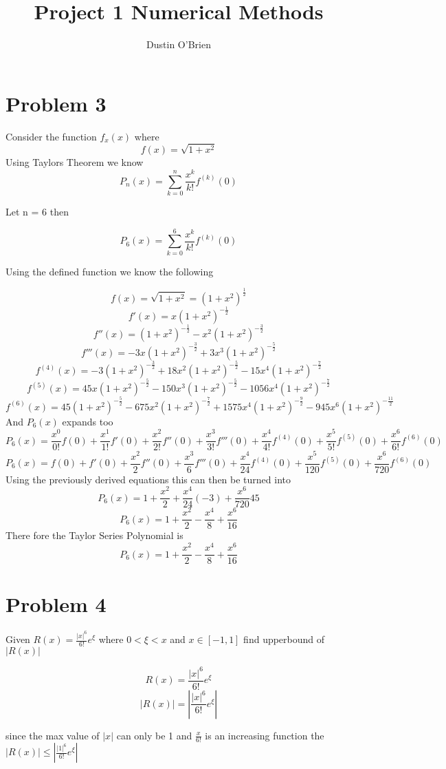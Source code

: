 \documentclass[]{article}
\title{Project 1 Numerical Methods}
\author{Dustin O'Brien}
\begin{document}
\maketitle


\section*{Problem 3}

	Consider the function $f_x(x)$ where
	\[f(x) = \sqrt{1 + x^2}\]
	Using Taylors Theorem we know
	\[P_n(x) = \sum_{k=0}^{n}\frac{x^k}{k!}f^{(k)}(0)\]
	
	Let n = 6 then

	\[P_6(x) = \sum_{k=0}^{6}\frac{x^k}{k!}f^{(k)}(0)\]
	
	Using the defined function we know the following
	
	\[f(x) = \sqrt{1 + x^2} = (1 + x^2)^{\frac{1}{2}}\]
	\[f'(x) = x(1 + x^2)^{-\frac{1}{2}}\]
	\[f''(x) = (1 + x^2)^{-\frac{1}{2}} - x^2(1 + x^2)^{-\frac{3}{2}}\]
	\[f'''(x) = -3x(1 + x^2)^{-\frac{3}{2}} + 3x^3(1 + x^2)^{-\frac{5}{2}}\]
	\[f^{(4)}(x) = -3(1 + x^2)^{-\frac{3}{2}} + 18x^2(1 + x^2)^{-\frac{5}{2}} - 15x^4(1 + x^2)^{-\frac{7}{2}}\]
	\[f^{(5)}(x) = 45x(1 + x^2)^{-\frac{5}{2}} -150x^3(1 + x^2)^{-\frac{5}{2}} - 1056x^4(1 + x^2)^{-\frac{7}{2}}\]
	\[f^{(6)}(x) = 45(1 + x^2)^{-\frac{5}{2}} - 675x^2(1+x^2)^{-\frac{7}{2}} + 1575x^4(1+x^2)^{-\frac{9}{2}} - 945x^6(1+x^2)^{-\frac{11}{2}}\]
	And $P_6(x)$ expands too
	\[P_6(x) = \frac{x^0}{0!}f(0)+\frac{x^1}{1!}f'(0)+\frac{x^2}{2!}f''(0)+\frac{x^3}{3!}f'''(0)+\frac{x^4}{4!}f^{(4)}(0)+\frac{x^5}{5!}f^{(5)}(0)+\frac{x^6}{6!}f^{(6)}(0)\]
	\[P_6(x) = f(0)+f'(0)+\frac{x^2}{2}f''(0)+\frac{x^3}{6}f'''(0)+\frac{x^4}{24}f^{(4)}(0)+\frac{x^5}{120}f^{(5)}(0)+\frac{x^6}{720}f^{(6)}(0)\]
	Using the previously derived equations this can then be turned into
	\[P_6(x) = 1+\frac{x^2}{2}+\frac{x^4}{24}(-3)+\frac{x^6}{720}45\]
	\[P_6(x) = 1+\frac{x^2}{2}-\frac{x^4}{8}+\frac{x^6}{16}\]
	There fore the Taylor Series Polynomial is
	\[P_6(x) = 1+\frac{x^2}{2}-\frac{x^4}{8}+\frac{x^6}{16}\]
	
	\section*{Problem 4}
	Given $R(x) = \frac{|x|^6}{6!}e^\xi$ where $0 < \xi < x$ and $x \in [-1,1]$ find upperbound of $|R(x)|$
	
	\[R(x) = \frac{|x|^6}{6!}e^\xi\]
	\[|R(x)| = |\frac{|x|^6}{6!}e^\xi|\]
	
	since the max value of $|x|$ can only be 1 and $\frac{x}{6!}$ is an increasing function the $|R(x)| \le |\frac{|1|^6}{6!}e^\xi|$
	
\end{document}
